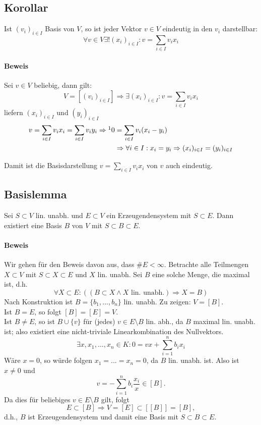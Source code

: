 \subsection{Korollar}
	\begin{Korollar}
		Ist $(v_i)_{i\in I}$ Basis von $ V $, so ist jeder Vektor $v\in V$ eindeutig in den $v_i$ darstellbar:
		\[\forall v\in V \exists! (x_i)_{i\in I}: v = \sum_{i\in I} v_ix_i\]
	\end{Korollar}

\paragraph{Beweis}
	Sei $v\in V$ beliebig, dann gilt:
		\[V = [(v_i)_{i\in I}] \Rightarrow \exists (x_i)_{i\in I}: v = \sum_{i\in I} v_ix_i\]
	liefern $(x_i)_{i\in I}$ und $(y_i)_{i\in I}$
	\begin{align*}
		v = \sum_{i\in I} v_ix_i = \sum_{i\in I}v_iy_i \Rightarrow\footnotemark 0 &= \sum_{i\in I} v_i(x_i-y_i)\\
                &\Rightarrow \forall i\in I: x_i = y_i \Rightarrow (x_i)_{i\in I} = (y_i)_{i\in I}
	\end{align*}

	Damit ist die Basisdarstellung $v = \sum_{i\in I} v_ix_i$ von $v$ auch eindeutig.

\subsection{Basislemma}
    \begin{Lemma}[Basislemma]
    	Sei $S\subset V$ lin. unabh. und $E\subset V$ ein Erzeugendensystem mit $S\subset E$. Dann existiert eine Basis $B$ von $V$ mit $S\subset B\subset E$.
    \end{Lemma}

\paragraph{Beweis}
    Wir gehen für den Beweis davon aus, dass $\#E<\infty$. Betrachte alle Teilmengen $X\subset V$ mit $S\subset X\subset E$ und $X$ lin. unabh. Sei $B$ eine solche Menge, die maximal ist, d.h.
        \[\forall X\subset E: ((B\subset X\land X\text{ lin. unabh.}) \Rightarrow X= B)\]
    Nach Konstruktion ist $B=\{b_1,...,b_n\}$ lin. unabh. Zu zeigen: $V=[B]$.\\
    Ist $B=E$, so folgt $[B]=[E]=V$.\\
    Ist $B\neq E$, so ist $B\cup \{v\} $ für (jedes) $v\in E\setminus B$ lin. abh., da $B$ maximal lin. unabh. ist; also existiert eine nicht-triviale Linearkombination des Nullvektors.
        \[\exists x,x_1,...,x_n \in K: 0=vx+\sum^n_{i=1}b_ix_i\]
    Wäre $x=0$, so würde folgen $x_1=...=x_n=0$, da $B$ lin. unabh. ist. 
    Also ist $x\neq 0$ und 
    	\[v=-\sum^n_{i=1} b_i\frac{x_i}{x} \in [B].\]
    Da dies für beliebiges $v\in E\setminus B$ gilt, folgt
    	\[E\subset [B] \Rightarrow V=[E]\subset [[B]] = [B],\]
    d.h., $ B $ ist Erzeugendensystem und damit eine Basis mit $S\subset B\subset E$.

